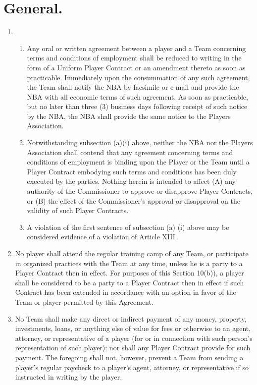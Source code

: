 \documentclass[
]{book}
\providecommand{\tightlist}{%
  \setlength{\itemsep}{0pt}\setlength{\parskip}{0pt}}
\begin{document}
\hypertarget{general.}{%
\section{General.}\label{general.}}

\begin{enumerate}
\def\labelenumi{(\alph{enumi})}
\item
  \begin{enumerate}
  \def\labelenumii{(\roman{enumii})}
  \tightlist
  \item
    Any oral or written agreement between a player and a Team concerning terms and conditions of employment shall be reduced to writing in the form of a Uniform Player Contract or an amendment thereto as soon as practicable. Immediately upon the consummation of any such agreement, the Team shall notify the NBA by facsimile or e-mail and provide the NBA with all economic terms of such agreement. As soon as practicable, but no later than three (3) business days following receipt of such notice by the NBA, the NBA shall provide the same notice to the Players Association.
  \item
    Notwithstanding subsection (a)(i) above, neither the NBA nor the Players Association shall contend that any agreement concerning terms and conditions of employment is binding upon the Player or the Team until a Player Contract embodying such terms and conditions has been duly executed by the parties. Nothing herein is intended to affect (A) any authority of the Commissioner to approve or disapprove Player Contracts, or (B) the effect of the Commissioner's approval or disapproval on the validity of such Player Contracts.
  \item
    A violation of the first sentence of subsection (a) (i) above may be considered evidence of a violation of Article XIII.
  \end{enumerate}
\item
  No player shall attend the regular training camp of any Team, or participate in organized practices with the Team at any time, unless he is a party to a Player Contract then in effect. For purposes of this Section 10(b)), a player shall be considered to be a party to a Player Contract then in effect if such Contract has been extended in accordance with an option in favor of the Team or player permitted by this Agreement.
\item
  No Team shall make any direct or indirect payment of any money, property, investments, loans, or anything else of value for fees or otherwise to an agent, attorney, or representative of a player (for or in connection with such person's representation of such player); nor shall any Player Contract provide for such payment. The foregoing shall not, however, prevent a Team from sending a player's regular paycheck to a player's agent, attorney, or representative if so instructed in writing by the player.
\end{enumerate}
\end{document}
